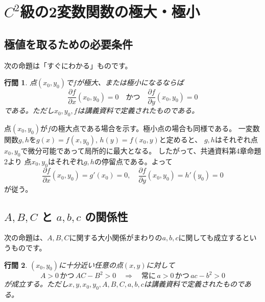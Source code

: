 \documentclass{article}
\makeatletter
\renewenvironment{proof}[1][\proofname]{\par
        \pushQED{\qed}
        \normalfont
        \topsep6\p@\@plus6\p@ \trivlist
        \item[\hskip\labelsep{\bfseries #1}\@addpunct{\bfseries}]\ignorespaces
    }{%
        \popQED\endtrivlist\@endpefalse
    }
\renewcommand{\proofname}{\underline{証明.}}
\newtheorem{lemma}{行間}
\makeatother
\begin{document}
\section{$C^2$級の2変数関数の極大・極小}

\subsection{極値を取るための必要条件}
次の命題は「すぐにわかる」ものです。
\begin{screen}
    \begin{lemma}
        点$(x_0, y_0)$で$f$が極大、または極小になるならば
        \begin{equation}
            \frac{\partial f}{\partial x}(x_0, y_0) = 0
            \quad \mbox{かつ} \quad
            \frac{\partial f}{\partial y}(x_0, y_0) = 0
        \end{equation}
        である。ただし$x_0, y_0, f$は講義資料で定義されたものである。
    \end{lemma}
\end{screen}

\begin{proof}
    点$(x_0, y_0)$が$f$の極大点である場合を示す。極小点の場合も同様である。
    一変数関数$g, h$を$g(x) = f(x, y_0),\,h(y) = f(x_0, y)$と定めると、
    $g, h$はそれぞれ点$x_0, y_0$で微分可能であって局所的に最大となる。
    したがって、共通資料第4章命題2より
    点$x_0, y_0$はそれぞれ$g, h$の停留点である。よって
    \begin{equation}
        \frac{\partial f}{\partial x}(x_0, y_0) = g'(x_0) = 0
        ,\quad
        \frac{\partial f}{\partial y}(x_0, y_0) = h'(y_0) = 0
    \end{equation}
    が従う。
\end{proof}

\subsection{$A, B, C$ と $a, b, c$ の関係性}
次の命題は、$A, B, C$に関する大小関係がまわりの$a, b, c$に関しても成立するというものです。
\begin{screen}
    \begin{lemma}
        $(x_0, y_0)$に十分近い任意の点$(x, y)$に対して
        \begin{equation}
            A > 0
            \,\mbox{かつ}\,
            AC - B^2 > 0
            \quad \Longrightarrow \quad
            \mbox{常に}\,
            a > 0
            \,\mbox{かつ}\,
            ac - b^2 > 0
        \end{equation}
        が成立する。ただし$x, y, x_0, y_0, A, B, C, a, b, c$は講義資料で定義されたものである。
    \end{lemma}
\end{screen}
\end{document}
